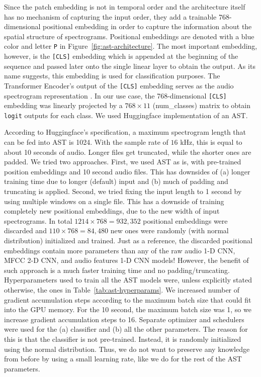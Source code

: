 Since the patch embedding is not in temporal order and the architecture itself has no mechanism of capturing the input order, they add a trainable 768-dimensional positional embedding in order to capture the information about the spatial structure of spectrograms. Positional embeddings are denoted with a blue color and letter \texttt{P} in Figure~\ref{fig:ast-architecture}. The most important embedding, however, is the \texttt{[CLS]} embedding which is appended at the beginning of the sequence and passed later onto the single linear layer to obtain the output. As its name suggests, this embedding is used for classification purposes. The Transformer Encoder's output of the \texttt{[CLS]} embedding serves as the audio spectrogram representation \cite{gong2021ast}. In our use case, the 768-dimensional \texttt{[CLS]} embedding was linearly projected by a $768 \times 11$ (num\_classes) matrix to obtain \texttt{logit} outputs for each class. We used Huggingface implementation of an AST.

According to Huggingface's specification, a maximum spectrogram length that can be fed into AST is 1024. With the sample rate of $16$ kHz, this is equal to about 10 seconds of audio. Longer files get truncated, while the shorter ones are padded. We tried two approaches. First, we used AST as is, with pre-trained position embeddings and 10 second audio files. This has downsides of (a) longer training time due to longer (default) input and (b) much of padding and truncating is applied. Second, we tried fixing the input length to 1 second by using multiple windows on a single file. This has a downside of training completely new positional embeddings, due to the new width of input spectrograms. In total $1214 \times 768 = 932,352$ positional embeddings were discarded and $110 \times 768 = 84,480$ new ones were randomly (with normal distribution) initialized and trained. Just as a reference, the discarded positional embeddings contain more parameters than any of the raw audio 1-D CNN, MFCC 2-D CNN, and audio features 1-D CNN models! However, the benefit of such approach is a much faster training time and no padding/truncating. Hyperparameters used to train all the AST models were, unless explicitly stated otherwise, the ones in Table~\ref{tab:ast-hyperparams}. We increased number of gradient accumulation steps according to the maximum batch size that could fit into the GPU memory. For the 10 second, the maximum batch size was 1, so we increase gradient accumulation steps to 16. Separate optimizer and schedulers were used for the (a) classifier and (b) all the other parameters. The reason for this is that the classifier is not pre-trained. Instead, it is randomly initialized using the normal distribution. Thus, we do not want to preserve any knowledge from before by using a small learning rate, like we do for the rest of the AST parameters. 

